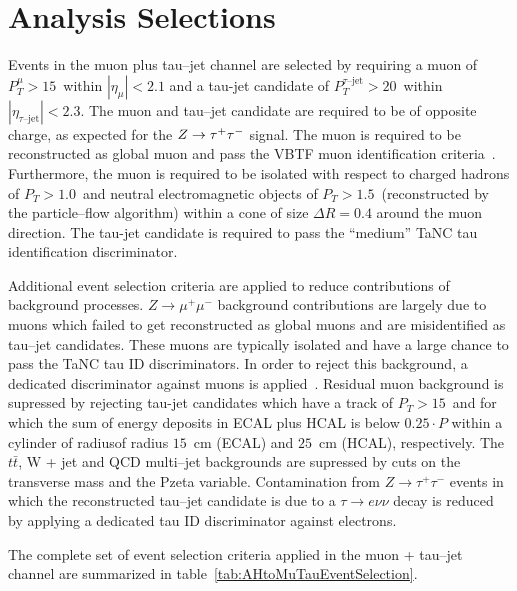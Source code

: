 \ifx\master\undefined\fi

\chapter{Analysis Selections}
\label{ch:selections}

Events in the muon plus tau--jet channel are selected by requiring a muon of
$P_{T}^{\mu} > 15$~\GeV within $ \left| \eta_{\mu} \right| < 2.1$ and a tau-jet
candidate of $P_{T}^{\tau\mbox{--jet}} > 20$~\GeV within $ \left|
\eta_{\tau\mbox{--jet}} \right| < 2.3$. The muon and tau--jet candidate are
required to be of opposite charge, as expected for the $Z\to\tau^+\tau^-$ signal.  The muon
is required to be reconstructed as global muon and pass the VBTF muon
identification criteria~\cite{EWK-10-002}. Furthermore, the muon is required to
be isolated with respect to charged hadrons of $P_{T} > 1.0$~\GeV and neutral
electromagnetic objects of $P_{T} > 1.5$~\GeV (reconstructed by the
particle--flow algorithm) within a cone of size $\Delta R = 0.4$ around the muon
direction.  The tau-jet candidate is required to pass the ``medium'' TaNC tau
identification discriminator.

Additional event selection criteria are applied to reduce
contributions of background processes. $Z
\rightarrow \mu^{+} \mu^{-}$ background contributions are largely due
to muons which failed to get reconstructed as global muons and are
misidentified as tau--jet candidates. These muons are typically
isolated and have a large chance to pass the TaNC tau ID discriminators. 
In order to reject this background, a dedicated
discriminator against muons is applied~\cite{PFT-08-001}. Residual
muon background is supressed by rejecting tau-jet candidates which have
a track of $P_{T} > 15$~\GeV and for which the sum of energy deposits
in ECAL plus HCAL is below $0.25 \cdot P$ within a cylinder of
radiusof radius $15$~cm (ECAL) and $25$~cm (HCAL), respectively.
The $t\bar{t}$, W + jet and QCD multi--jet backgrounds are supressed
by cuts on the transverse mass and the Pzeta variable.
Contamination from $Z
\rightarrow \tau^{+} \tau^{-}$ events in which the reconstructed
tau--jet candidate is due to a $\tau \rightarrow e \nu \nu$ decay is
reduced by applying a dedicated tau ID discriminator against
electrons.

The complete set of event selection criteria applied in the muon +
tau--jet channel are summarized in table~\ref{tab:AHtoMuTauEventSelection}.

